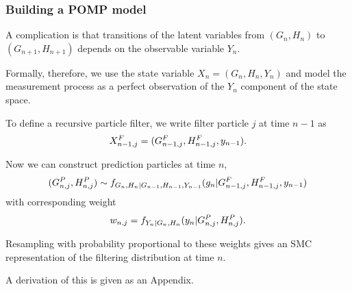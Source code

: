 \documentclass{beamer}
\begin{document}
\begin{frame}[fragile]

\frametitle{Building a POMP model}

\begin{knitrout}\small
{}\color{fgcolor}\begin{kframe}
\begin{alltt}
\end{alltt}
\end{kframe}
\end{knitrout}

\bi

\item A complication is that transitions of the latent variables from $(G_n,H_n)$ to $(G_{n+1},H_{n+1})$ depends on the observable variable $Y_{n}$. 

\item Formally, therefore, we use the state variable $X_n=(G_{n},H_{n},Y_{n})$ and model the measurement process as a perfect observation of the $Y_n$ component of the state space. 

\item To define a recursive particle filter, we write filter particle $j$ at time $n-1$ as 
$$ X^F_{n-1,j}=(G^F_{n-1,j},H^F_{n-1,j},y_{n-1}).$$

\item Now we can construct prediction particles at time $n$,
$$(G^P_{n,j},H^P_{n,j})\sim f_{G_{n},H_n|G_{n-1},H_{n-1},Y_{n-1}}(g_n|G^F_{n-1,j},H^F_{n-1,j},y_{n-1})$$
with corresponding weight 
$$w_{n,j}=f_{Y_n|G_n,H_n}(y_n|G^P_{n,j},H^P_{n,j}).$$

\item Resampling with probability proportional to these weights gives an SMC representation of the filtering distribution at time $n$.

\item A derivation of this is given as an Appendix. 


\ei


\end{frame}
\end{document}

